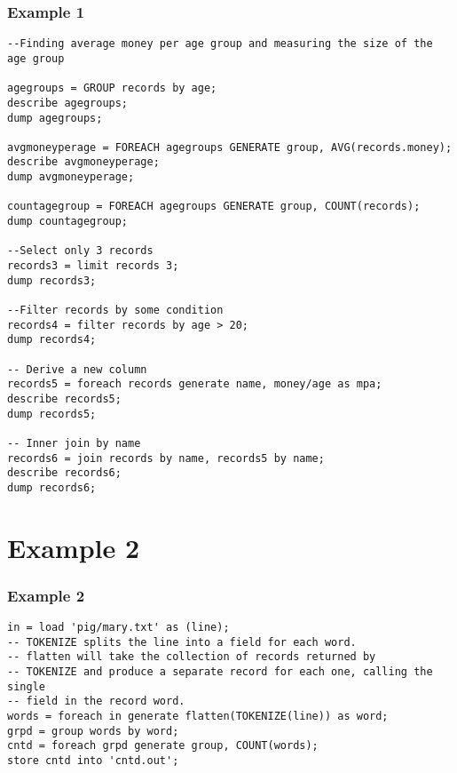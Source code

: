\documentclass{beamer}
\begin{document}
\begin{frame}[fragile]
 \frametitle{Example 1}
{\color{mycolorcode}
  \begin{lstlisting}[frame=single, basicstyle=\tiny]
--Finding average money per age group and measuring the size of the age group

agegroups = GROUP records by age;
describe agegroups;
dump agegroups;

avgmoneyperage = FOREACH agegroups GENERATE group, AVG(records.money);
describe avgmoneyperage;
dump avgmoneyperage;

countagegroup = FOREACH agegroups GENERATE group, COUNT(records);
dump countagegroup;

--Select only 3 records
records3 = limit records 3;
dump records3;

--Filter records by some condition
records4 = filter records by age > 20;
dump records4;

-- Derive a new column
records5 = foreach records generate name, money/age as mpa;
describe records5;
dump records5;

-- Inner join by name
records6 = join records by name, records5 by name;
describe records6;
dump records6;    
  \end{lstlisting}
}
\end{frame}

\section{Example 2}
\begin{frame}[fragile]
 \frametitle{Example 2}
{\color{mycolorcode}
  \begin{lstlisting}[frame=single, basicstyle=\tiny]
in = load 'pig/mary.txt' as (line);
-- TOKENIZE splits the line into a field for each word.
-- flatten will take the collection of records returned by
-- TOKENIZE and produce a separate record for each one, calling the single
-- field in the record word.
words = foreach in generate flatten(TOKENIZE(line)) as word;
grpd = group words by word;
cntd = foreach grpd generate group, COUNT(words);
store cntd into 'cntd.out';
  \end{lstlisting}
}
\end{frame}
    
\end{document}
